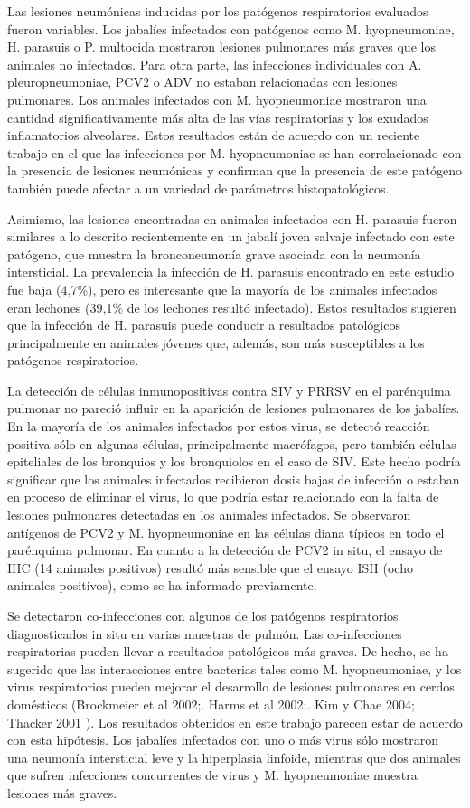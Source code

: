 \documentclass[12pt,a4paper,Spanish]{book}
\begin{document}
Las lesiones neumónicas inducidas por los patógenos respiratorios evaluados fueron variables. Los jabalíes infectados con patógenos como M. hyopneumoniae, H. parasuis o P. multocida mostraron lesiones pulmonares más graves que los animales no infectados. Para otra parte, las infecciones individuales con A. pleuropneumoniae, PCV2 o ADV no estaban relacionadas con lesiones pulmonares. Los animales infectados con M. hyopneumoniae mostraron una cantidad significativamente más alta de las vías respiratorias y los exudados inflamatorios alveolares. Estos resultados están de acuerdo con un reciente trabajo en el que las infecciones por M. hyopneumoniae se han correlacionado con la presencia de lesiones neumónicas y confirman que la presencia de este patógeno también puede afectar a un variedad de parámetros histopatológicos.

Asimismo, las lesiones encontradas en animales infectados con H. parasuis fueron similares a lo descrito recientemente en un jabalí joven salvaje infectado con este patógeno, que muestra la bronconeumonía grave asociada con la neumonía intersticial. La prevalencia la infección de H. parasuis encontrado en este estudio fue baja (4,7\%), pero es interesante que la mayoría de los animales infectados eran lechones (39,1\% de los lechones resultó infectado). Estos resultados sugieren que la infección de H. parasuis puede conducir a resultados patológicos principalmente en animales jóvenes que, además, son más susceptibles a los patógenos respiratorios.

La detección de células inmunopositivas contra SIV y PRRSV en el parénquima pulmonar no pareció influir en la aparición de lesiones pulmonares de los jabalíes. En la mayoría de los animales infectados por estos virus, se detectó reacción positiva sólo en algunas células, principalmente macrófagos, pero también células epiteliales de los bronquios y los bronquiolos en el caso de SIV. Este hecho podría significar que los animales infectados recibieron dosis bajas de infección o estaban en proceso de eliminar el virus, lo que podría estar relacionado con la falta de lesiones pulmonares detectadas en los animales infectados. Se observaron antígenos de PCV2 y M. hyopneumoniae en las células diana típicos en todo el parénquima pulmonar. En cuanto a la detección de PCV2 in situ, el ensayo de IHC (14 animales positivos) resultó más sensible que el ensayo ISH (ocho animales positivos), como se ha informado previamente.

Se detectaron co-infecciones con algunos de los patógenos respiratorios diagnosticados in situ en varias muestras de pulmón. Las co-infecciones respiratorias pueden llevar a resultados patológicos más graves. De hecho, se ha sugerido que las interacciones entre bacterias tales como M. hyopneumoniae, y los virus respiratorios pueden mejorar el desarrollo de lesiones pulmonares en cerdos domésticos (Brockmeier et al 2002;. Harms et al 2002;. Kim y Chae 2004; Thacker 2001 ). Los resultados obtenidos en este trabajo parecen estar de acuerdo con esta hipótesis. Los jabalíes infectados con uno o más virus sólo mostraron una neumonía intersticial leve y la hiperplasia linfoide, mientras que dos animales que sufren infecciones concurrentes de virus y M. hyopneumoniae muestra lesiones más graves.
\end{document}
